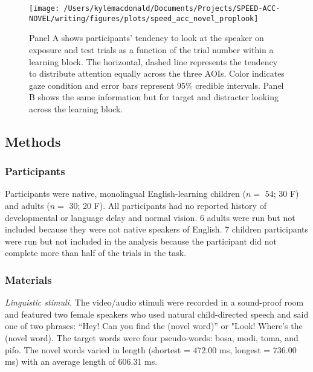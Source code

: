 \documentclass[10pt, letterpaper]{article}
\newenvironment{CodeChunk}{}{}
\begin{document}
\begin{CodeChunk}
\begin{figure*}[t]

{\centering \texttt{[image: /Users/kylemacdonald/Documents/Projects/SPEED-ACC-NOVEL/writing/figures/plots/speed\_acc\_novel\_proplook]} 

}

\caption[Panel A shows participants’ tendency to look at the speaker on exposure and test trials as a function of the trial number within a learning block]{Panel A shows participants’ tendency to look at the speaker on exposure and test trials as a function of the trial number within a learning block. The horizontal, dashed line represents the tendency to distribute attention equally across the three AOIs. Color indicates gaze condition and error bars represent 95\% credible intervals. Panel B shows the same information but for target and distracter looking across the learning block.}\label{fig:san-prop-looking-plot}
\end{figure*}
\end{CodeChunk}

\hypertarget{methods-1}{%
\subsection{Methods}\label{methods-1}}

\hypertarget{participants-1}{%
\subsubsection{Participants}\label{participants-1}}

Participants were native, monolingual English-learning children (\(n=\)
54; 30 F) and adults (\(n=\) 30; 20 F). All participants had no reported
history of developmental or language delay and normal vision. 6 adults
were run but not included because they were not native speakers of
English. 7 children participants were run but not included in the
analysis because the participant did not complete more than half of the
trials in the task.

\hypertarget{materials-1}{%
\subsubsection{Materials}\label{materials-1}}

\emph{Linguistic stimuli.} The video/audio stimuli were recorded in a
sound-proof room and featured two female speakers who used natural
child-directed speech and said one of two phrases: ``Hey! Can you find
the (novel word)'' or "Look! Where's the (novel word). The target words
were four pseudo-words: bosa, modi, toma, and pifo. The novel words
varied in length (shortest = 472.00 ms, longest = 736.00 ms) with an
average length of 606.31 ms.
\end{document}
